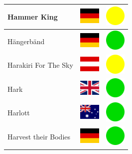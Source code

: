 \documentclass[12pt, a4paper, twoside]{report}
\begin{document}
\begin{center}
\begin{longtable}{|p{5cm}|p{2cm}|p{2cm}|}
 Hammer King                                                & \includegraphics[width=1cm]{../img/flags/de} &   \includegraphics[width=1cm]{../likes/m} \\ \hline
 Hängerbänd                                                 & \includegraphics[width=1cm]{../img/flags/de} &   \includegraphics[width=1cm]{../likes/y} \\ \hline
 Harakiri For The Sky                                       & \includegraphics[width=1cm]{../img/flags/at} &   \includegraphics[width=1cm]{../likes/m} \\ \hline
 Hark                                                       & \includegraphics[width=1cm]{../img/flags/gb} &   \includegraphics[width=1cm]{../likes/y} \\ \hline
 Harlott                                                    & \includegraphics[width=1cm]{../img/flags/au} &   \includegraphics[width=1cm]{../likes/y} \\ \hline
 Harvest their Bodies                                       & \includegraphics[width=1cm]{../img/flags/de} &   \includegraphics[width=1cm]{../likes/y} \\ \hline

\end{longtable}
\end{center}
\end{document}
